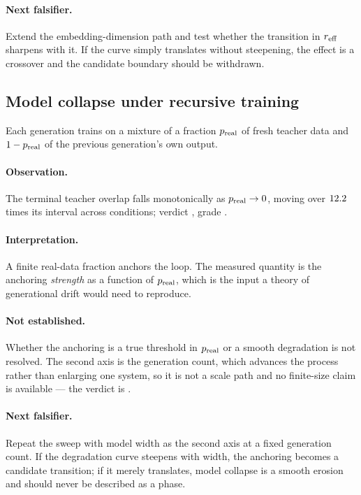 \paragraph{Next falsifier.} Extend the embedding-dimension path and test
whether the transition in $r_{\rm eff}$ sharpens with it. If the curve simply
translates without steepening, the effect is a crossover and the candidate
boundary should be withdrawn.

\subsection{Model collapse under recursive training}

Each generation trains on a mixture of a fraction $p_{\rm real}$ of fresh
teacher data and $1-p_{\rm real}$ of the previous generation's own output.

\paragraph{Observation.} The terminal teacher overlap falls monotonically as
$p_{\rm real}\to0$, moving over
$12.2{}$ times its interval across
\AtlasModelCollapseConditions{} conditions; verdict
\emph{\AtlasModelCollapseVerdict{}}, grade \AtlasModelCollapseGrade{}.

\paragraph{Interpretation.} A finite real-data fraction anchors the loop. The
measured quantity is the anchoring \emph{strength} as a function of
$p_{\rm real}$, which is the input a theory of generational drift would need to
reproduce.

\paragraph{Not established.} Whether the anchoring is a true threshold in
$p_{\rm real}$ or a smooth degradation is not resolved. The second axis is the
generation count, which advances the process rather than enlarging one system,
so it is not a scale path and no finite-size claim is available --- the verdict
is \emph{\AtlasModelCollapseVerdict{}}.

\paragraph{Next falsifier.} Repeat the sweep with model width as the second
axis at a fixed generation count. If the degradation curve steepens with width,
the anchoring becomes a candidate transition; if it merely translates, model
collapse is a smooth erosion and should never be described as a phase.

